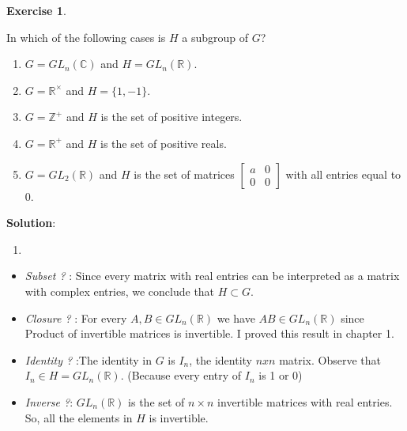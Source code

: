 \documentclass[
]{book}
\providecommand{\tightlist}{%
  \setlength{\itemsep}{0pt}\setlength{\parskip}{0pt}}
\theoremstyle{definition}
\theoremstyle{definition}
\theoremstyle{definition}
\newtheorem{exercise}{Exercise}[chapter]
\theoremstyle{definition}
\theoremstyle{remark}
\begin{document}
\begin{exercise}
\protect\hypertarget{exr:unnamed-chunk-50}{}\label{exr:unnamed-chunk-50}

In which of the following cases is \(H\) a subgroup of \(G\)?

\begin{enumerate}
\def\labelenumi{(\alph{enumi})}
\item
  \(G = GL_n(\mathbb{C})\) and \(H = GL_n(\mathbb{R})\).
\item
  \(G = \mathbb{R}^\times\) and \(H = \{1, -1\}\).
\item
  \(G = \mathbb{Z}^+\) and \(H\) is the set of positive integers.
\item
  \(G = \mathbb{R}^+\) and \(H\) is the set of positive reals.
\item
  \(G = GL_2(\mathbb{R})\) and \(H\) is the set of matrices \(\begin{bmatrix} a & 0 \\ 0 & 0 \end{bmatrix}\) with all entries equal to 0.
\end{enumerate}

\end{exercise}

\textbf{Solution}:\\

\begin{enumerate}
\def\labelenumi{(\alph{enumi})}
\tightlist
\item
\end{enumerate}

\begin{itemize}
\item
  \emph{Subset ?} : Since every matrix with real entries can be interpreted as a matrix with complex entries, we conclude that \(H \subset G\).
\item
  \emph{Closure ?} : For every \(A, B \in GL_n(\mathbb{R})\) we have \(AB \in GL_n(\mathbb{R})\) since Product of invertible matrices is invertible. I proved this result in chapter 1.
\item
  \emph{Identity ?} :The identity in \(G\) is \(I_n\), the identity \(n x n\) matrix. Observe that \(I_n\in H=GL_n(\mathbb{R})\). (Because every entry of \(I_n\) is 1 or 0)
\item
  \emph{Inverse ?}: \(GL_n(\mathbb{R})\) is the set of \(n \times n\) invertible matrices with real entries. So, all the elements in \(H\) is invertible.
\end{itemize}
\end{document}

